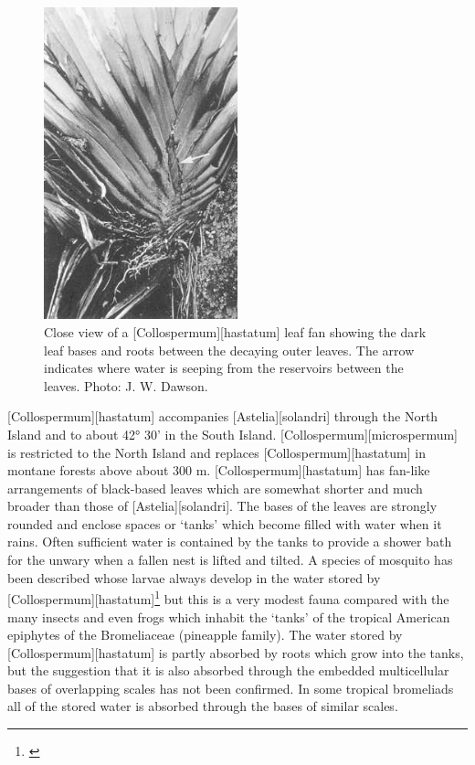 \begin{figure}
	\includegraphics[width=0.5\textwidth]{graphics/figure41collospermum.jpg}
	\centering
	\caption[Close view of a Collospermum hastatum leaf fan]{Close view of a [Collospermum][hastatum] leaf fan showing the dark leaf bases and roots between the decaying outer leaves.
	The arrow indicates where water is seeping from the reservoirs between the leaves.
	Photo: J. W. Dawson.}%
	\label{fig:41collospermum}
\end{figure}

[Collospermum][hastatum] accompanies [Astelia][solandri] through the North Island and to about 42° 30' in the South Island. [Collospermum][microspermum] is restricted to the North Island and replaces [Collospermum][hastatum] in montane forests above about 300 m. [Collospermum][hastatum] has fan-like arrangements of black-based leaves which are somewhat shorter and much broader than those of [Astelia][solandri].
The bases of the leaves are strongly rounded and enclose spaces or `tanks' which become filled with water when it rains.
Often sufficient water is contained by the tanks to provide a shower bath for the unwary when a fallen  nest is lifted and tilted.
A species of mosquito has been described whose larvae always develop in the water stored by [Collospermum][hastatum]\footnote{\cite{belkin1968mosquito}} but this is a very modest fauna compared with the many insects and even frogs which inhabit the `tanks' of the tropical American epiphytes of the Bromeliaceae (pineapple family).
The water stored by [Collospermum][hastatum] is partly absorbed by roots which grow into the tanks, but the suggestion that it is also absorbed through the embedded multicellular bases of overlapping scales has not been confirmed.
In some tropical bromeliads all of the stored water is absorbed through the bases of similar scales.

